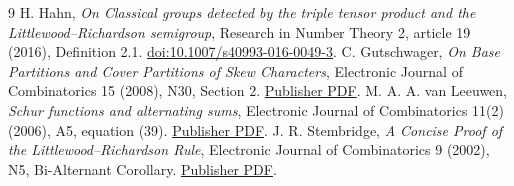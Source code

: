 \documentclass[11pt]{article}
\begin{document}
\begin{thebibliography}{9}\small
{} H. Hahn, \emph{On Classical groups detected by the triple tensor
product and the Littlewood--Richardson semigroup}, Research in Number Theory
2, article 19 (2016), Definition 2.1.
\href{https://doi.org/10.1007/s40993-016-0049-3}{doi:10.1007/s40993-016-0049-3}.
 C. Gutschwager, \emph{On Base Partitions and Cover
Partitions of Skew Characters}, Electronic Journal of Combinatorics 15
(2008), N30, Section 2.
\href{https://www.combinatorics.org/ojs/index.php/eljc/article/download/v15i1n30/pdf/}{Publisher PDF}.
 M. A. A. van Leeuwen, \emph{Schur functions and alternating
sums}, Electronic Journal of Combinatorics 11(2) (2006), A5, equation (39).
\href{https://www.combinatorics.org/ojs/index.php/eljc/article/download/v11i2a5/pdf/}{Publisher PDF}.
 J. R. Stembridge, \emph{A Concise Proof of the
Littlewood--Richardson Rule}, Electronic Journal of Combinatorics 9 (2002),
N5, Bi-Alternant Corollary.
\href{https://www.combinatorics.org/ojs/index.php/eljc/article/download/v9i1n5/pdf}{Publisher PDF}.
\end{thebibliography}
\end{document}
